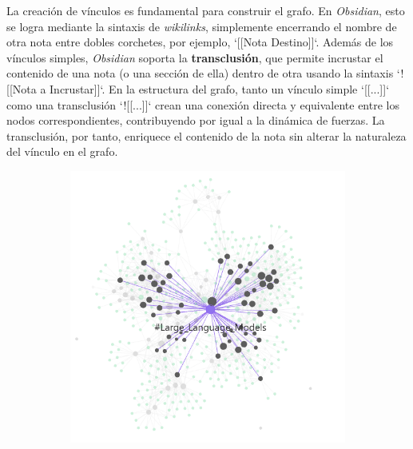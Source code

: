 La creación de vínculos es fundamental para construir el grafo. En \textit{Obsidian}, esto se logra mediante la sintaxis de \textit{wikilinks}, simplemente encerrando el nombre de otra nota entre dobles corchetes, por ejemplo, `[[Nota Destino]]`. Además de los vínculos simples, \textit{Obsidian} soporta la \textbf{transclusión}, que permite incrustar el contenido de una nota (o una sección de ella) dentro de otra usando la sintaxis `![[Nota a Incrustar]]`. En la estructura del grafo, tanto un vínculo simple `[[...]]` como una transclusión `![[...]]` crean una conexión directa y equivalente entre los nodos correspondientes, contribuyendo por igual a la dinámica de fuerzas. La transclusión, por tanto, enriquece el contenido de la nota sin alterar la naturaleza del vínculo en el grafo.

\begin{figure}[h!]
    \centering
    \begin{subfigure}[b]{0.48\textwidth}
        \centering
        \includegraphics[width=\textwidth]{figures/LLM_tag_graph.png}
        \label{fig:llm_tag}
    \end{subfigure}
    \hfill
    \begin{subfigure}[b]{0.48\textwidth}
        \centering

\end{subfigure}
\end{figure}
